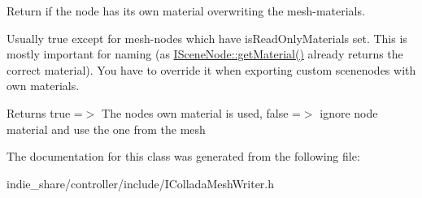 Return if the node has it\textquotesingle{}s own material overwriting the mesh-\/materials. 

Usually true except for mesh-\/nodes which have is\+Read\+Only\+Materials set. This is mostly important for naming (as \hyperlink{classirr_1_1scene_1_1ISceneNode_a1f44d8cf753b2e4c17c90d4fc2ed05b2}{I\+Scene\+Node\+::get\+Material()} already returns the correct material). You have to override it when exporting custom scenenodes with own materials. \begin{DoxyReturn}{Returns}
true =$>$ The node\textquotesingle{}s own material is used, false =$>$ ignore node material and use the one from the mesh 
\end{DoxyReturn}


The documentation for this class was generated from the following file\+:\begin{DoxyCompactItemize}
\item 
indie\+\_\+share/controller/include/I\+Collada\+Mesh\+Writer.\+h\end{DoxyCompactItemize}
